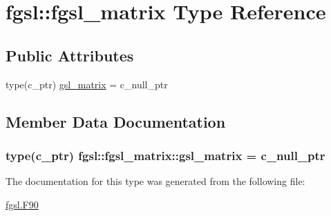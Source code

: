 \hypertarget{structfgsl_1_1fgsl__matrix}{}\section{fgsl\+:\+:fgsl\+\_\+matrix Type Reference}
\label{structfgsl_1_1fgsl__matrix}
\subsection*{Public Attributes}
\begin{DoxyCompactItemize}
\item 
type(c\+\_\+ptr) \hyperlink{structfgsl_1_1fgsl__matrix_af53153abbad993e0d423a1c3919ed56b}{gsl\+\_\+matrix} = c\+\_\+null\+\_\+ptr
\end{DoxyCompactItemize}


\subsection{Member Data Documentation}
\hypertarget{structfgsl_1_1fgsl__matrix_af53153abbad993e0d423a1c3919ed56b}{}
\subsubsection[{gsl\+\_\+matrix}]{\setlength{\rightskip}{0pt plus 5cm}type(c\+\_\+ptr) fgsl\+::fgsl\+\_\+matrix\+::gsl\+\_\+matrix = c\+\_\+null\+\_\+ptr}\label{structfgsl_1_1fgsl__matrix_af53153abbad993e0d423a1c3919ed56b}


The documentation for this type was generated from the following file\+:\begin{DoxyCompactItemize}
\item 
\hyperlink{fgsl_8F90}{fgsl.\+F90}\end{DoxyCompactItemize}
